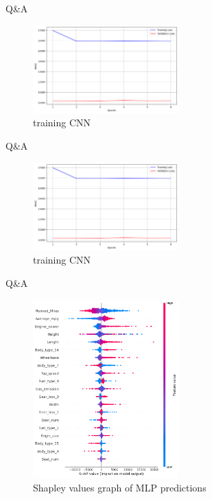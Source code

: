 \documentclass{beamer}
\begin{document}
\begin{frame}{Q\&A}
    \begin{figure}[ht]
        \centering
        \includegraphics[width=0.5\textwidth]{training CNN.png}
        \caption{training CNN}
        \label{Training CNN}
    \end{figure}

    \end{frame}


    \begin{frame}{Q\&A}
    \begin{figure}[ht]
        \centering
        \includegraphics[width=0.5\textwidth]{training CNN.png}
        \caption{training CNN}
        \label{Training CNN}
    \end{figure}

    \end{frame}
    
    \begin{frame}{Q\&A}

    \begin{figure}[ht]
        \centering
        \includegraphics[width=0.5\textwidth]{shap MLP.png}
        \caption{Shapley values graph of MLP predictions}
        \label{shap MLP}
    \end{figure}
    \end{frame}
\end{document}
